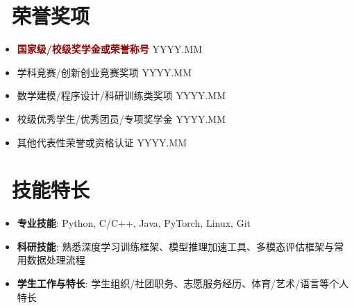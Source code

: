 \documentclass[10pt,a4paper]{ctexart}
\newcommand{\resumeItem}[1]{\item #1}
\begin{document}
\section*{\faTrophy\ 荣誉奖项}
\begin{itemize}
    \resumeItem{\textcolor{darkred}{\textbf{国家级/校级奖学金或荣誉称号}} \hfill YYYY.MM}
    \resumeItem{学科竞赛/创新创业竞赛奖项 \hfill YYYY.MM}
    \resumeItem{数学建模/程序设计/科研训练类奖项 \hfill YYYY.MM}
    \resumeItem{校级优秀学生/优秀团员/专项奖学金 \hfill YYYY.MM}
    \resumeItem{其他代表性荣誉或资格认证 \hfill YYYY.MM}
\end{itemize}

\section*{\faWrench\ 技能特长}
\begin{itemize}[parsep=0.2ex]
    \item \textbf{专业技能}: Python, C/C++, Java, PyTorch, Linux, Git
    \item \textbf{科研技能}: 熟悉深度学习训练框架、模型推理加速工具、多模态评估框架与常用数据处理流程
    \item \textbf{学生工作与特长}: 学生组织/社团职务、志愿服务经历、体育/艺术/语言等个人特长
\end{itemize}
\end{document}
